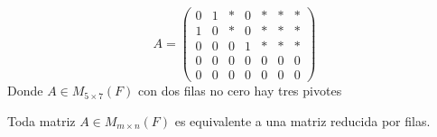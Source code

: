\documentclass[12pt,a4paper]{book}
\begin{document}
    \begin{ejemplo}
        \begin{equation*}
            A=
            \begin{pmatrix}
                0 & 1 & * & 0 & * & * & *\\
                1 & 0 & * & 0 & * & * & *\\
                0 & 0 & 0 & 1 & * & * & *\\
                0 & 0 & 0 & 0 & 0 & 0 & 0\\
                0 & 0 & 0 & 0 & 0 & 0 & 0
            \end{pmatrix}
        \end{equation*}
        Donde $A\in M_{5\times7}(F)$ con dos filas no cero hay tres pivotes
    \end{ejemplo}

    \vspace{1cm}

    \begin{proposicion}
        Toda matriz $A\in M_{m\times n}(F)$ es equivalente a una matriz reducida por filas.
    \end{proposicion}
\end{document}
